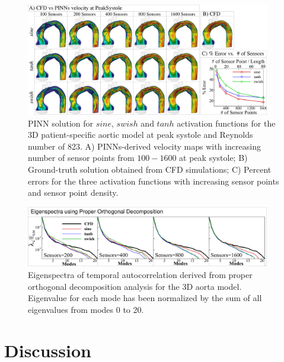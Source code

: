 \documentclass[times,twocolumn,final]{elsarticle}
\begin{document}
{%
\begin{figure}[!t]
\centering
\includegraphics[width=0.95\textwidth]{./Figures/Figure5_Aorta}
\caption{PINN solution for $sine$, $swish$ and $tanh$ activation functions for the 3D patient-specific aortic model at peak systole and Reynolds number of 823. A) PINNs-derived velocity maps with increasing number of sensor points from $100-1600$ at peak systole; B) Ground-truth solution obtained from CFD simulations; C)  Percent errors for the three activation functions with increasing sensor points and sensor point density. }
\label{fig:Results_5}
\end{figure}

\begin{figure}[!t]
\centering
\includegraphics[width=0.95\textwidth]{./Figures/Figure6_Aorta_POD}
\caption{Eigenspectra of temporal autocorrelation derived from proper orthogonal decomposition analysis for the 3D aorta model. Eigenvalue for each mode has been normalized by the sum of all eigenvalues from modes 0 to 20.}
\label{fig:Results_6}
\end{figure}

\section{Discussion}
}
\end{document}
